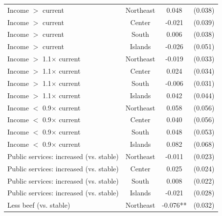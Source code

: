 \begin{table}[H]
\begin{tabular}{ l c c c }
\hspace{0.05cm} Income $>$ current & Northeast & 0.048 & (0.038) \\
\hspace{0.05cm} Income $>$ current & Center & -0.021 & (0.039) \\
\hspace{0.05cm} Income $>$ current & South & 0.006 & (0.038) \\
\hspace{0.05cm} Income $>$ current & Islands & -0.026 & (0.051) \\
\hspace{0.05cm} Income $>$ 1.1$\times$ current & Northeast & -0.019 & (0.033) \\
\hspace{0.05cm} Income $>$ 1.1$\times$ current & Center & 0.024 & (0.034) \\
\hspace{0.05cm} Income $>$ 1.1$\times$ current & South & -0.006 & (0.031) \\
\hspace{0.05cm} Income $>$ 1.1$\times$ current & Islands & 0.042 & (0.044) \\
\hspace{0.05cm} Income $<$ 0.9$\times$ current & Northeast & 0.058 & (0.056) \\
\hspace{0.05cm} Income $<$ 0.9$\times$ current & Center & 0.040 & (0.056) \\
\hspace{0.05cm} Income $<$ 0.9$\times$ current & South & 0.048 & (0.053) \\
\hspace{0.05cm} Income $<$ 0.9$\times$ current & Islands & 0.082 & (0.068) \\
\hspace{0.05cm} Public services: increased (vs. stable) & Northeast & -0.011 & (0.023) \\
\hspace{0.05cm} Public services: increased (vs. stable) & Center & 0.025 & (0.024) \\
\hspace{0.05cm} Public services: increased (vs. stable) & South & 0.008 & (0.022) \\
\hspace{0.05cm} Public services: increased (vs. stable) & Islands & -0.021 & (0.028) \\
\hspace{0.05cm} Less beef (vs. stable) & Northeast & -0.076** & (0.032) \\

\end{tabular}
\end{table}
